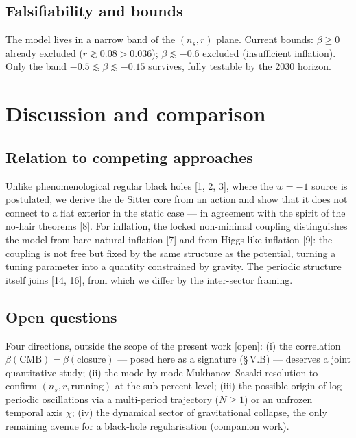 \documentclass[11pt,a4paper]{article}
\newcommand{\statut}[1]{{\footnotesize\textsf{[#1]}}}
\theoremstyle{plain}
\theoremstyle{remark}
\begin{document}
\subsection{Falsifiability and bounds}
The model lives in a narrow band of the $(n_s,r)$ plane. Current bounds: $\beta\ge0$ already
excluded ($r\gtrsim0.08>0.036$); $\beta\lesssim-0.6$ excluded (insufficient inflation). Only
the band $-0.5\lesssim\beta\lesssim-0.15$ survives, fully testable by the 2030 horizon.

\section{Discussion and comparison}
\subsection{Relation to competing approaches}
Unlike phenomenological regular black holes [1, 2, 3], where the $w=-1$ source is postulated,
we derive the de Sitter core from an action and show that it does not connect to a flat
exterior in the static case --- in agreement with the spirit of the no-hair theorems [8].
For inflation, the locked non-minimal coupling distinguishes the model from bare natural
inflation [7] and from Higgs-like inflation [9]: the coupling is not free but fixed by the
same structure as the potential, turning a tuning parameter into a quantity constrained by
gravity. The periodic structure itself joins [14, 16], from which we differ by the
inter-sector framing.

\subsection{Open questions}
Four directions, outside the scope of the present work \statut{open}: (i) the correlation
$\beta(\mathrm{CMB})=\beta(\text{closure})$ --- posed here as a signature (\S\,V.B) ---
deserves a joint quantitative study; (ii) the mode-by-mode Mukhanov--Sasaki resolution to
confirm $(n_s,r,\text{running})$ at the sub-percent level; (iii) the possible origin of
log-periodic oscillations via a multi-period trajectory ($N\ge1$) or an unfrozen temporal
axis $\chi$; (iv) the dynamical sector of gravitational collapse, the only remaining avenue
for a black-hole regularisation (companion work).

\end{document}
